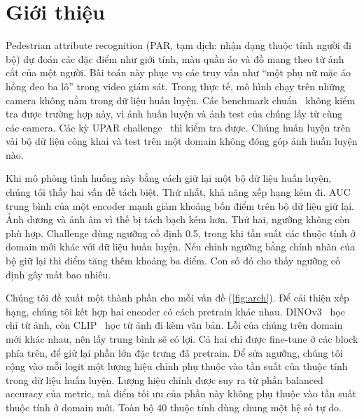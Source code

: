 \documentclass[10pt,twocolumn,letterpaper]{article}
\begin{document}
\section{Giới thiệu}
\label{sec:intro}

Pedestrian attribute recognition (PAR, tạm dịch: nhận dạng thuộc tính người đi bộ) dự đoán các đặc điểm như giới tính, màu quần áo và đồ mang theo từ ảnh cắt của một người. Bài toán này phục vụ các truy vấn như ``một phụ nữ mặc áo hồng đeo ba lô'' trong video giám sát. Trong thực tế, mô hình chạy trên những camera không nằm trong dữ liệu huấn luyện. Các benchmark chuẩn~\cite{peta,pa100k,market} không kiểm tra được trường hợp này, vì ảnh huấn luyện và ảnh test của chúng lấy từ cùng các camera. Các kỳ UPAR challenge~\cite{upar,upar23,upar24} thì kiểm tra được. Chúng huấn luyện trên vài bộ dữ liệu công khai và test trên một domain không đóng góp ảnh huấn luyện nào.

Khi mô phỏng tình huống này bằng cách giữ lại một bộ dữ liệu huấn luyện, chúng tôi thấy hai vấn đề tách biệt. Thứ nhất, khả năng xếp hạng kém đi. AUC trung bình của một encoder mạnh giảm khoảng bốn điểm trên bộ dữ liệu giữ lại. Ảnh dương và ảnh âm vì thế bị tách bạch kém hơn. Thứ hai, ngưỡng không còn phù hợp. Challenge dùng ngưỡng cố định 0.5, trong khi tần suất các thuộc tính ở domain mới khác với dữ liệu huấn luyện. Nếu chỉnh ngưỡng bằng chính nhãn của bộ giữ lại thì điểm tăng thêm khoảng ba điểm. Con số đó cho thấy ngưỡng cố định gây mất bao nhiêu.

Chúng tôi đề xuất một thành phần cho mỗi vấn đề (\cref{fig:arch}). Để cải thiện xếp hạng, chúng tôi kết hợp hai encoder có cách pretrain khác nhau. DINOv3~\cite{dinov3} học chỉ từ ảnh, còn CLIP~\cite{clip} học từ ảnh đi kèm văn bản. Lỗi của chúng trên domain mới khác nhau, nên lấy trung bình sẽ có lợi. Cả hai chỉ được fine-tune ở các block phía trên, để giữ lại phần lớn đặc trưng đã pretrain. Để sửa ngưỡng, chúng tôi cộng vào mỗi logit một lượng hiệu chỉnh phụ thuộc vào tần suất của thuộc tính trong dữ liệu huấn luyện. Lượng hiệu chỉnh được suy ra từ phần balanced accuracy của metric, mà điểm tối ưu của phần này không phụ thuộc vào tần suất thuộc tính ở domain mới. Toàn bộ 40 thuộc tính dùng chung một hệ số tự do.
\end{document}

